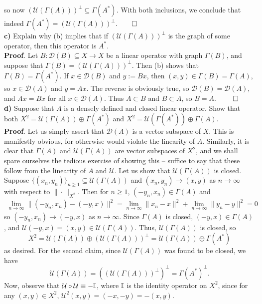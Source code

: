 \documentclass[10pt]{article}
\newcommand{\1}[1]{\mathbbm{1}_{#1}} \newcommand{\mc}[1]{\mathcal{#1}}
\begin{document}
    so now $(\mc{U}(\Gamma(A)))^\perp\subseteq\Gamma(A^\ast)$. With both inclusions, we conclude that indeed $\Gamma(A^\ast)=(\mc{U}(\Gamma(A)))^\perp$.\hfill{$\qed$}\\[5pt]
    {\bf c)} Explain why (b) implies that if $(\mc{U}(\Gamma(A)))^\perp$ is the graph of some operator, then this operator is $A^\ast$.\\[5pt]
    {\bf Proof}. Let $B:\mc{D}(B)\subseteq X\rightarrow X$ be a linear operator with graph $\Gamma(B)$, and suppose that $\Gamma(B)=(\mc{U}(\Gamma(A)))^\perp$. Then (b) shows that $\Gamma(B)=\Gamma(A^\ast)$. If $x\in\mc{D}(B)$ and $y:=Bx$, then $(x,y)\in\Gamma(B)=\Gamma(A)$,
    so $x\in\mc{D}(A)$ and $y=Ax$. The reverse is obviously true, so $\mc{D}(B)=\mc{D}(A)$, and $Ax=Bx$ for all $x\in\mc{D}(A)$. Thus $A\subset B$ and $B\subset A$, so $B=A$. \hfill{$\qed$}\\[5pt]
    {\bf d)} Suppose that $A$ is a densely defined and closed linear operator. Show that both $X^2=\mc{U}(\Gamma(A))\oplus\Gamma(A^\ast)$ and $X^2=\mc{U}(\Gamma(A^\ast))\oplus\Gamma(A)$.\\[5pt]
    {\bf Proof}. Let us simply assert that $\mc{D}(A)$ is a vector subspace of $X$. This is manifestly obvious, for otherwise would violate the linearity of $A$. Similarly, it is clear that $\Gamma(A)$ and $\mc{U}(\Gamma(A))$ are vector subspaces of $X^2$, and
    we shall spare ourselves the tedious exercise of showing this -- suffice to say that these follow from the linearity of $A$ and $\mc{U}$. Let us show that $\mc{U}(\Gamma(A))$ is closed. Suppose $\{(x_n,y_n)\}_{n\geq 1}\subseteq\mc{U}(\Gamma(A))$
    and $(x_n,y_n)\rightarrow(x,y)$ as $n\rightarrow\infty$ with respect to $\|\cdot\|_{X^2}$. Then for $n\geq 1$, $(-y_n,x_n)\in\Gamma(A)$ and
    \begin{align*}
        \lim_{n\rightarrow\infty}\|(-y_n,x_n)-(-y,x)\|^2=\lim_{n\rightarrow\infty}\|x_n-x\|^2+\lim_{n \rightarrow\infty}\|y_n-y\|^2=0
    \end{align*}
    so $(-y_n,x_n)\rightarrow(-y,x)$ as $n\rightarrow\infty$. Since $\Gamma(A)$ is closed, $(-y,x)\in\Gamma(A)$, and $\mc{U}(-y,x)=(x,y)\in\mc{U}(\Gamma(A))$. Thus, $\mc{U}(\Gamma(A))$ is closed, so
    \[X^2=\mc{U}(\Gamma(A))\oplus(\mc{U}(\Gamma(A)))^\perp=\mc{U}(\Gamma(A))\oplus\Gamma(A^\ast)\]
    as desired. For the second claim, since $\mc{U}(\Gamma(A))$ was found to be closed, we have
    \[\mc{U}(\Gamma(A))=((\mc{U}(\Gamma(A)))^\perp)^\perp=\Gamma(A^\ast)^\perp.\]
    Now, observe that $\mc{U}\circ\mc{U}\equiv-\mbb{I}$, where $\mathbb{I}$ is the identity operator on $X^2$, since for any $(x,y)\in X^2$, $\mc{U}^2(x,y)=(-x,-y)=-(x,y)$.
\end{document}

